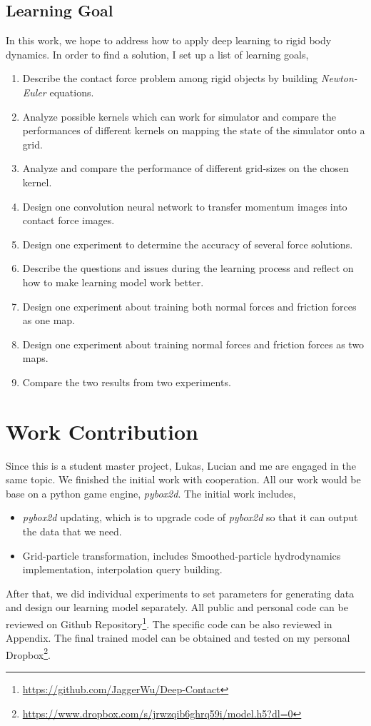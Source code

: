     \subsection{Learning Goal}
    In this work, we hope to address how to apply deep learning to rigid body dynamics. In order to find a solution, I set up a list of learning goals, 
    \begin{enumerate}
        \item Describe the contact force problem among rigid objects by building \textit{Newton-Euler} equations.
        \item Analyze possible kernels which can work for simulator and compare the performances of different kernels on mapping the state of the simulator onto a grid.
        \item Analyze and compare the performance of different grid-sizes on the chosen kernel. 
        \item Design one convolution neural network to transfer momentum images into contact force images.
        \item Design one experiment to determine the accuracy of several force solutions.
        \item Describe the questions and issues during the learning process and reflect on how to make learning model work better.
        \item Design one experiment about training both normal forces and friction forces as one map.
        \item Design one experiment about training normal forces and friction forces as two maps.
        \item Compare the two results from two experiments.
    \end{enumerate}

\section{Work Contribution}
    Since this is a student master project, Lukas, Lucian and me are engaged in the same topic. We finished the initial work with cooperation. All our work would be base on a python game engine, \textit{pybox2d}. The initial work includes,

    \begin{itemize}
        \item \textit{pybox2d} updating, which is to upgrade code of \textit{pybox2d} so that it can output the data that we need.
        \item Grid-particle transformation, includes Smoothed-particle hydrodynamics implementation, interpolation query building.
    \end{itemize}
    After that, we did individual experiments to set parameters for generating data and design our learning model separately. All public and personal code can be reviewed on Github Repository\footnote{\url{https://github.com/JaggerWu/Deep-Contact}}. The specific code can be also reviewed in Appendix. The final trained model can be obtained and tested on my personal Dropbox\footnote{\url{https://www.dropbox.com/s/jrwzqib6ghrq59i/model.h5?dl=0}}.